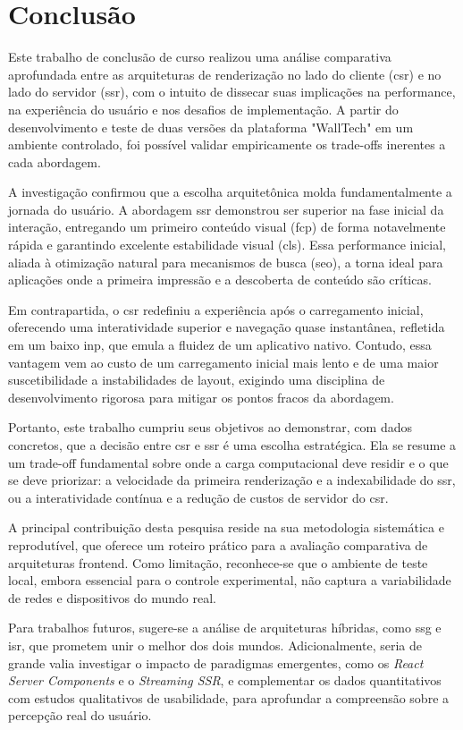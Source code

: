 \chapter{Conclusão}
\label{cap:conclusao}

Este trabalho de conclusão de curso realizou uma análise comparativa aprofundada entre as arquiteturas de renderização no lado do cliente (\acrfull{csr}) e no lado do servidor (\acrfull{ssr}), com o intuito de dissecar suas implicações na performance, na experiência do usuário e nos desafios de implementação. A partir do desenvolvimento e teste de duas versões da plataforma "WallTech" em um ambiente controlado, foi possível validar empiricamente os trade-offs inerentes a cada abordagem.

A investigação confirmou que a escolha arquitetônica molda fundamentalmente a jornada do usuário. A abordagem \acrshort{ssr} demonstrou ser superior na fase inicial da interação, entregando um primeiro conteúdo visual (\acrfull{fcp}) de forma notavelmente rápida e garantindo excelente estabilidade visual (\acrfull{cls}). Essa performance inicial, aliada à otimização natural para mecanismos de busca (\acrfull{seo}), a torna ideal para aplicações onde a primeira impressão e a descoberta de conteúdo são críticas.

Em contrapartida, o \acrshort{csr} redefiniu a experiência após o carregamento inicial, oferecendo uma interatividade superior e navegação quase instantânea, refletida em um baixo \acrfull{inp}, que emula a fluidez de um aplicativo nativo. Contudo, essa vantagem vem ao custo de um carregamento inicial mais lento e de uma maior suscetibilidade a instabilidades de layout, exigindo uma disciplina de desenvolvimento rigorosa para mitigar os pontos fracos da abordagem.

Portanto, este trabalho cumpriu seus objetivos ao demonstrar, com dados concretos, que a decisão entre \acrshort{csr} e \acrshort{ssr} é uma escolha estratégica. Ela se resume a um trade-off fundamental sobre onde a carga computacional deve residir e o que se deve priorizar: a velocidade da primeira renderização e a indexabilidade do \acrshort{ssr}, ou a interatividade contínua e a redução de custos de servidor do \acrshort{csr}.

A principal contribuição desta pesquisa reside na sua metodologia sistemática e reprodutível, que oferece um roteiro prático para a avaliação comparativa de arquiteturas frontend. Como limitação, reconhece-se que o ambiente de teste local, embora essencial para o controle experimental, não captura a variabilidade de redes e dispositivos do mundo real.

Para trabalhos futuros, sugere-se a análise de arquiteturas híbridas, como \acrfull{ssg} e \acrfull{isr}, que prometem unir o melhor dos dois mundos. Adicionalmente, seria de grande valia investigar o impacto de paradigmas emergentes, como os \textit{React Server Components} e o \textit{Streaming SSR}, e complementar os dados quantitativos com estudos qualitativos de usabilidade, para aprofundar a compreensão sobre a percepção real do usuário.